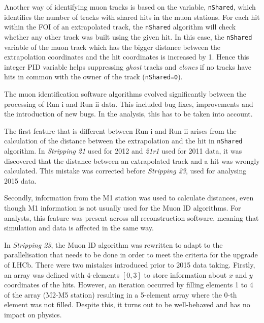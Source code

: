 Another way of identifying muon tracks is based on the variable, \texttt{nShared}, which identifies the number of tracks with shared hits in the muon stations. For each hit within the \gls{FOI} of an extrapolated track, the \texttt{nShared} algorithm will check whether any other track was built using the given hit. In this case, the \texttt{nShared} variable of the muon track which has the bigger distance between the extrapolation coordinates and the hit coordinates is increased by 1. Hence this integer \gls{PID} variable helps suppressing \textit{ghost} tracks and \textit{clones} if no tracks have hits in common with the owner of the track (\texttt{nShared=0}).

The muon identification software algorithms evolved significantly between the processing of Run \Rn{1} and Run \Rn{2} data. This included bug fixes, improvements and the introduction of new bugs. In the \Bmumumu analysis, this has to be taken into account.


The first feature that is different between Run \Rn{1} and Run \Rn{2} arises from the calculation of the distance between the extrapolation and the hit in \texttt{nShared} algorithm.
In \textit{Stripping 21} used for 2012 and \textit{21r1} used for 2011 data, it was discovered that the distance between an extrapolated track and a hit was wrongly calculated. This mistake was corrected before \textit{Stripping 23}, used for analysing 2015 data. 

Secondly, information from the M1 station was used to calculate distances, even though M1 information is not usually used for the Muon ID algorithms.  For analysts, this feature was present across all reconstruction software, meaning that simulation and data is affected in the same way.

In \textit{Stripping 23}, the Muon ID algorithm was rewritten to adapt to the parallelisation that needs to be done in order to meet the criteria for the upgrade of \gls{LHCb}. There were two mistakes introduced prior to 2015 data taking.
Firstly, an array was defined with 4-elements $[0,3]$ to store information about $x$ and $y$ coordinates of the hits. However, an iteration occurred by filling elements 1 to 4 of the array (M2-M5 station) resulting in a 5-element array where the 0-th element was not filled. Despite this, it turns out to be well-behaved and has no impact on physics.

